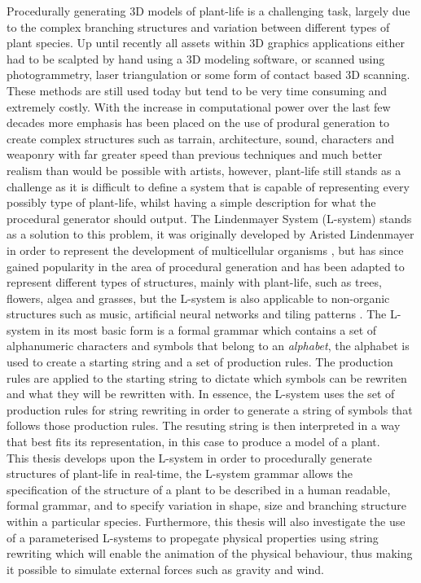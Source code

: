 
\lettrine[lines=3]{P}{}rocedurally generating 3D models of plant-life is a challenging task, largely due to the complex branching structures and variation between different types of plant species. Up until recently all assets within 3D graphics applications either had to be scalpted by hand using a 3D modeling software, or scanned using photogrammetry, laser triangulation or some form of contact based 3D scanning. These methods are still used today but tend to be very time consuming and extremely costly. With the increase in computational power over the last few decades more emphasis has been placed on the use of produral generation to create complex structures such as tarrain, architecture, sound, characters and weaponry with far greater speed than previous techniques and much better realism than would be possible with artists, however, plant-life still stands as a challenge as it is difficult to define a system that is capable of representing every possibly type of plant-life, whilst having a simple description for what the procedural generator should output. The Lindenmayer System (L-system) stands as a solution to this problem, it was originally developed by Aristed Lindenmayer in order to represent the development of multicellular organisms \cite{lindenmayer1968mathematical}, but has since gained popularity in the area of procedural generation and has been adapted to represent different types of structures, mainly with plant-life, such as trees, flowers, algea and grasses, but the L-system is also applicable to non-organic structures such as music, artificial neural networks and tiling patterns \cite{Prusinkiewicz1989}. The L-system in its most basic form is a formal grammar which contains a set of alphanumeric characters and symbols that belong to an \textit{alphabet}, the alphabet is used to create a starting string and a set of production rules. The production rules are applied to the starting string to dictate which symbols can be rewriten and what they will be rewritten with. In essence, the L-system uses the set of production rules for string rewriting in order to generate a string of symbols that follows those production rules. The resuting string is then interpreted in a way that best fits its representation, in this case to produce a model of a plant. \\

This thesis develops upon the L-system in order to procedurally generate structures of plant-life in real-time, the L-system grammar allows the specification of the structure of a plant to be described in a human readable, formal grammar, and to specify variation in shape, size and branching structure within a particular species. Furthermore, this thesis will also investigate the use of a parameterised L-systems to propegate physical properties using string rewriting which will enable the animation of the physical behaviour, thus making it possible to simulate external forces such as gravity and wind.




